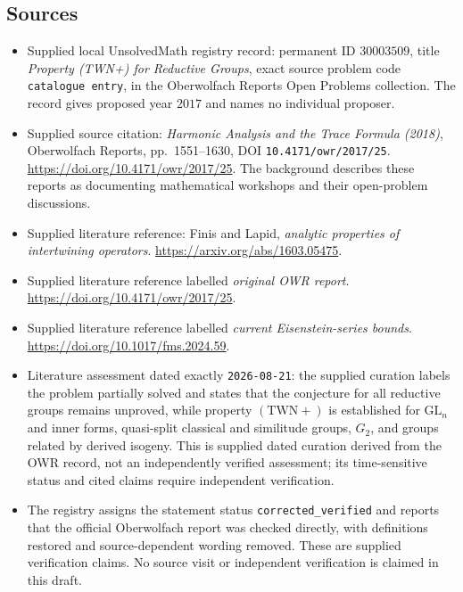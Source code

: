 \documentclass[11pt]{article}
\begin{document}
\subsection{Sources}
\begin{itemize}
\item Supplied local UnsolvedMath registry record: permanent ID \(30003509\), title \emph{Property (TWN+) for Reductive Groups}, exact source problem code \texttt{catalogue entry}, in the Oberwolfach Reports Open Problems collection. The record gives proposed year \(2017\) and names no individual proposer.
\item Supplied source citation: \emph{Harmonic Analysis and the Trace Formula (2018)}, Oberwolfach Reports, pp.~1551--1630, DOI \texttt{10.4171/owr/2017/25}. \url{https://doi.org/10.4171/owr/2017/25}. The background describes these reports as documenting mathematical workshops and their open-problem discussions.
\item Supplied literature reference: Finis and Lapid, \emph{analytic properties of intertwining operators}. \url{https://arxiv.org/abs/1603.05475}.
\item Supplied literature reference labelled \emph{original OWR report}. \url{https://doi.org/10.4171/owr/2017/25}.
\item Supplied literature reference labelled \emph{current Eisenstein-series bounds}. \url{https://doi.org/10.1017/fms.2024.59}.
\item Literature assessment dated exactly \texttt{2026-08-21}: the supplied curation labels the problem partially solved and states that the conjecture for all reductive groups remains unproved, while property \((\mathrm{TWN}+ )\) is established for \(\mathrm{GL}_n\) and inner forms, quasi-split classical and similitude groups, \(G_2\), and groups related by derived isogeny. This is supplied dated curation derived from the OWR record, not an independently verified assessment; its time-sensitive status and cited claims require independent verification.
\item The registry assigns the statement status \texttt{corrected\_verified} and reports that the official Oberwolfach report was checked directly, with definitions restored and source-dependent wording removed. These are supplied verification claims. No source visit or independent verification is claimed in this draft.
\end{itemize}
\end{document}
